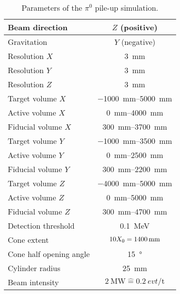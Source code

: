 \begin{table}[htb]
	\centering
	\caption{Parameters of the $\pi^0$ pile-up simulation.}
	\label{tab:dune-nd_pile-up-params}
	\begin{tabu} to \textwidth {|l|S|}
		\hline
		{Beam direction} &			{$Z$ (positive)} \\
		\hline
		{Gravitation} &				{$Y$ (negative)} \\
		\hline
		{Resolution $X$} &			\SI{3}{\milli\metre} \\
		\hline
		{Resolution $Y$} &			\SI{3}{\milli\metre} \\
		\hline
		{Resolution $Z$} &			\SI{3}{\milli\metre} \\
		\hline
		{Target volume $X$} &		\SIrange{-1000}{5000}{\milli\metre} \\
		\hline
		{Active volume $X$} &		\SIrange{0}{4000}{\milli\metre} \\
		\hline
		{Fiducial volume $X$} &		\SIrange{300}{3700}{\milli\metre} \\
		\hline
		{Target volume $Y$} &		\SIrange{-1000}{3500}{\milli\metre} \\
		\hline
		{Active volume $Y$} &		\SIrange{0}{2500}{\milli\metre} \\
		\hline
		{Fiducial volume $Y$} &		\SIrange{300}{2200}{\milli\metre} \\
		\hline
		{Target volume $Z$} &		\SIrange{-4000}{5000}{\milli\metre} \\
		\hline
		{Active volume $Z$} &		\SIrange{0}{5000}{\milli\metre} \\
		\hline
		{Fiducial volume $Z$} &		\SIrange{300}{4700}{\milli\metre} \\
		\hline
		{Detection threshold} &		\SI{0.1}{\mega\electronvolt} \\
		\hline
		{Cone extent} &				{$10 X_{\mathrm{0}} = \SI{1400}{\milli\metre}$} \\
		\hline
		{Cone half opening angle} &	\SI{15}{\degree} \\
		\hline
		{Cylinder radius} &			\SI{25}{\milli\metre} \\
		\hline
		{Beam intensity} &			{$\SI{2}{\mega\watt} \widehat{=} \SI{0.2}{evt\per\tonne}$} \\
		\hline
	\end{tabu}
\end{table}